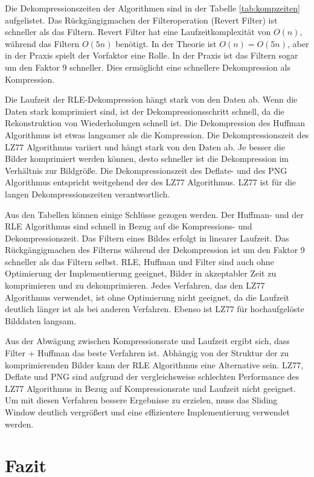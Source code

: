 \documentclass[conference]{IEEEtran}
\begin{document}
Die Dekompressionszeiten der Algorithmen sind in der Tabelle
\ref{tab:kompzeiten} aufgelistet.
Das Rückgängigmachen der Filteroperation (Revert Filter) ist
schneller als das Filtern.
Revert Filter hat eine Laufzeitkomplexität von $O(n)$, während das Filtern
$O(5n)$ benötigt.
In der Theorie ist $O(n) = O(5n)$, aber in der Praxis spielt der
Vorfaktor eine Rolle.
In der Praxis ist das Filtern sogar um den Faktor 9 schneller.
Dies ermöglicht eine schnellere Dekompression als Kompression.

Die Laufzeit der RLE-Dekompression hängt stark von den Daten ab.
Wenn die Daten stark komprimiert sind, ist der Dekompressionsschritt
schnell, da die Rekonstruktion von Wiederholungen schnell ist.
Die Dekompression des Huffman Algorithmus ist etwas langsamer
als die Kompression.
Die Dekompressionszeit des LZ77 Algorithmus variiert und hängt
stark von den Daten ab.
Je besser die Bilder komprimiert werden können, desto schneller
ist die Dekompression im Verhältnis zur Bildgröße.
Die Dekompressionszeit des Deflate- und des PNG Algorithmus entspricht
weitgehend der des LZ77 Algorithmus.
LZ77 ist für die langen Dekompressionszeiten verantwortlich.

Aus den Tabellen können einige Schlüsse gezogen werden.
Der Huffman- und der RLE Algorithmus sind schnell in Bezug auf die
Kompressions- und Dekompressionszeit.
Das Filtern eines Bildes erfolgt in linearer Laufzeit.
Das Rückgängigmachen des Filterns während der Dekompression ist um
den Faktor 9 schneller als das Filtern selbst.
RLE, Huffman und Filter sind auch ohne Optimierung der Implementierung
geeignet, Bilder in akzeptabler Zeit zu komprimieren und zu dekomprimieren.
Jedes Verfahren, das den LZ77 Algorithmus verwendet, ist ohne Optimierung
nicht geeignet, da die Laufzeit deutlich länger ist als bei anderen Verfahren.
Ebenso ist LZ77 für hochaufgelöste Bilddaten langsam.

Aus der Abwägung zwischen Kompressionsrate und Laufzeit ergibt sich, dass
Filter + Huffman das beste Verfahren ist.
Abhängig von der Struktur der zu komprimierenden Bilder kann der RLE
Algorithmus eine Alternative sein.
LZ77, Deflate und PNG sind aufgrund der vergleichsweise schlechten Performance
des LZ77 Algorithmus in Bezug auf Kompressionsrate und Laufzeit nicht geeignet.
Um mit diesen Verfahren bessere Ergebnisse zu erzielen, muss das Sliding Window
deutlich vergrößert und eine effizientere Implementierung verwendet werden.


\section{Fazit}
\end{document}
